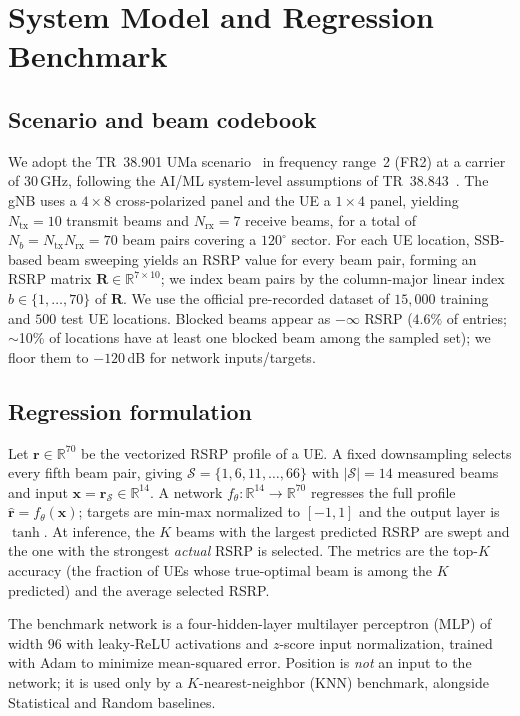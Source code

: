 \documentclass[conference]{IEEEtran}
\begin{document}
\section{System Model and Regression Benchmark}\label{sec:benchmark}

\subsection{Scenario and beam codebook}
We adopt the TR~38.901 UMa scenario~\cite{tr38901} in frequency range~2 (FR2) at
a carrier of $30$\,GHz, following the AI/ML system-level assumptions of
TR~38.843~\cite{tr38843}. The gNB uses
a $4\times8$ cross-polarized panel and the UE a $1\times4$ panel, yielding
$N_{\mathrm{tx}}=10$ transmit beams and $N_{\mathrm{rx}}=7$ receive beams, for a
total of $N_b=N_{\mathrm{tx}}N_{\mathrm{rx}}=70$ beam pairs covering a
$120^\circ$ sector. For each UE location, SSB-based beam sweeping yields an RSRP
value for every beam pair, forming an RSRP matrix
$\mathbf{R}\in\mathbb{R}^{7\times 10}$; we index beam pairs by the column-major
linear index $b\in\{1,\dots,70\}$ of $\mathbf{R}$. We use the official
pre-recorded dataset of $15{,}000$ training and $500$ test UE locations. Blocked
beams appear as $-\infty$ RSRP ($4.6\%$ of entries; $\sim$10\% of locations have
at least one blocked beam among the sampled set); we floor them to $-120$\,dB for
network inputs/targets.

\subsection{Regression formulation}
Let $\mathbf{r}\in\mathbb{R}^{70}$ be the vectorized RSRP profile of a UE.
A fixed downsampling selects every fifth beam pair, giving
$\mathcal{S}=\{1,6,11,\dots,66\}$ with $|\mathcal{S}|=14$ measured beams and input
$\mathbf{x}=\mathbf{r}_{\mathcal{S}}\in\mathbb{R}^{14}$. A network
$f_\theta:\mathbb{R}^{14}\!\to\!\mathbb{R}^{70}$ regresses the full profile
$\hat{\mathbf{r}}=f_\theta(\mathbf{x})$; targets are min-max normalized to
$[-1,1]$ and the output layer is $\tanh$. At inference, the $K$ beams with the
largest predicted RSRP are swept and the one with the strongest \emph{actual}
RSRP is selected. The metrics are the top-$K$ accuracy (the fraction of UEs whose
true-optimal beam is among the $K$ predicted) and the average selected RSRP.

The benchmark network is a four-hidden-layer multilayer perceptron (MLP) of width
$96$ with leaky-ReLU activations and $z$-score input normalization, trained with
Adam to minimize mean-squared error. Position is \emph{not} an input to the
network; it is used only by a $K$-nearest-neighbor (KNN) benchmark, alongside
Statistical and Random baselines.
\end{document}
